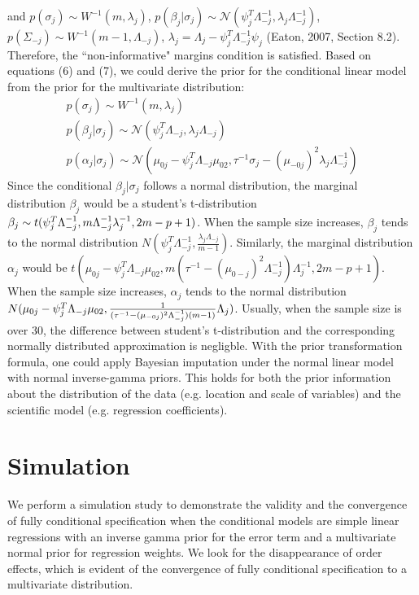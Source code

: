 \documentclass[12pt, fullpage, a4paper]{article}
\begin{document}
and $p(\sigma_{j}) \sim W^{-1}(m, \lambda_j)$, $p(\beta_{j}|\sigma_{j}) \sim \mathcal{N}(\psi_{j}^T\Lambda_{-j}^{-1}, \lambda_j\Lambda_{-j}^{-1})$, $p(\Sigma_{-j}) \sim W^{-1}(m-1, \Lambda_{-j})$, $\lambda_j = \Lambda_{j} - \psi_{j}^T\Lambda_{-j}^{-1}\psi_{j}$ (Eaton, 2007, Section 8.2). Therefore, the ``non-informative" margins condition is satisfied.
Based on equations (6) and (7), we could derive the prior for the conditional linear model from the prior for the multivariate distribution:
\begin{equation}
\begin{array}{l}
p(\sigma_{j}) \sim W^{-1}(m, \lambda_j)\\
p(\beta_{j}|\sigma_{j}) \sim \mathcal{N}(\psi_{j}^T\Lambda_{-j}, \lambda_j\Lambda_{-j})\\
p(\alpha_{j}|\sigma_{j}) \sim \mathcal{N}(\mu_{0j} - \psi_{j}^T\Lambda_{-j}\mu_{02}, \tau^{-1}\sigma_{j} - (\mu_{-0j})^{2}\lambda_j\Lambda_{-j}^{-1})
\end{array}
\end{equation} 
Since the conditional $\beta_{j} | \sigma_{j}$ follows a normal distribution, the marginal distribution $\beta_{j}$ would be a student's t-distribution $\beta_{j} \sim t(\psi_{j}^T\Lambda_{-j}^{-1}, \\m\Lambda_{-j}^{-1}\lambda_{j}^{-1}, 2m-p+1)$. When the sample size increases, $\beta_{j}$ tends to the normal distribution $N(\psi_{j}^T\Lambda_{-j}^{-1}, \frac{\lambda_{j}\Lambda_{-j}}{m-1})$. Similarly, the marginal distribution $\alpha_{j}$ would be $t(\mu_{0j} - \psi_{j}^T\Lambda_{-j}\mu_{02}, m(\tau^{-1} - (\mu_{0-j})^{2}\Lambda_{-j}^{-1})\Lambda_{j}^{-1}, 2m-p+1)$. When the sample size increases, $\alpha_{j}$ tends to the normal distribution $N(\mu_{0j} - \psi_{j}^T\Lambda_{-j}\mu_{02},\\
 \frac{1}{(\tau^{-1} - (\mu_{-0j})^{2}\Lambda_{-j}^{-1})(m-1)}\Lambda_{j})$. Usually, when the sample size is over 30, the difference between student's t-distribution and the corresponding normally distributed approximation is negligble. With the prior transformation formula, one could apply Bayesian imputation under the normal linear model with normal inverse-gamma priors. This holds for both the prior information about the distribution of the data (e.g. location and scale of variables) and the scientific model (e.g. regression coefficients).  

\section{Simulation}
We perform a simulation study to demonstrate the validity and the convergence of fully conditional specification when the conditional models are simple linear regressions with an inverse gamma prior for the error term and a multivariate normal prior for regression weights. We look for the disappearance of order effects, which is evident of the convergence of fully conditional specification to a multivariate distribution. 
\end{document}
